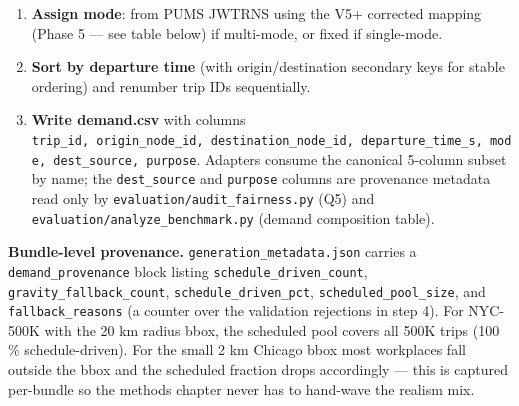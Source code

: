 \begin{enumerate}
  \textbf{Discretization caveat.} Census PUMS records JWMNP in
  \textbf{integer minutes}, so the per-person commute is quantised to
  60-second steps. Combined with the formula above, every person
  reporting the same JWMNP value (e.g., a 6-minute commute) lands on the
  \emph{exact same} \texttt{departure\_time\_s} (e.g., 28440 s = 7:54:00
  AM in the AM peak). For chicago\_1k\_car this collapses 1000 trips
  onto only 20 distinct departure timestamps; for nyc\_10k\_car, 10000
  trips onto 34 timestamps. The aggregate temporal \emph{shape} (peak
  hour distribution, JWMNP histogram) is realistic; the per-second
  departures are not --- at 7:00, 7:15, 7:30, 7:54 etc. SimForge
  releases burst cohorts of trips simultaneously rather than spreading
  them across a continuous range. This is faithful to
  PUMS\textquotesingle s integer-minute reporting, not a SimForge
  artefact, but it is visible in the \texttt{animated\_flow} particle
  visualization (\texttt{visualization/README.md} documents this as the
  "departure burst" effect). Adding sub-minute uniform jitter to spread
  bucket-mates across their 60s window is feature-ready in the demand
  generator but disabled by default to keep \texttt{demand.csv}
  byte-deterministic across regenerations.
\item
  \textbf{Assign mode}: from PUMS JWTRNS using the V5+ corrected mapping
  (Phase 5 --- see table below) if multi-mode, or fixed if single-mode.
\item
  \textbf{Sort by departure time} (with origin/destination secondary
  keys for stable ordering) and renumber trip IDs sequentially.
\item
  \textbf{Write demand.csv} with columns
  \texttt{trip\_id,\ origin\_node\_id,\ destination\_node\_id,\ departure\_time\_s,\ mode,\ dest\_source,\ purpose}.
  Adapters consume the canonical 5-column subset by name; the
  \texttt{dest\_source} and \texttt{purpose} columns are provenance
  metadata read only by \texttt{evaluation/audit\_fairness.py} (Q5) and
  \texttt{evaluation/analyze\_benchmark.py} (demand composition table).
\end{enumerate}

\textbf{Bundle-level provenance.} \texttt{generation\_metadata.json}
carries a \texttt{demand\_provenance} block listing
\texttt{schedule\_driven\_count}, \texttt{gravity\_fallback\_count},
\texttt{schedule\_driven\_pct}, \texttt{scheduled\_pool\_size}, and
\texttt{fallback\_reasons} (a counter over the validation rejections in
step 4). For NYC-500K with the 20 km radius bbox, the scheduled pool
covers all 500K trips (100 \% schedule-driven). For the small 2 km
Chicago bbox most workplaces fall outside the bbox and the scheduled
fraction drops accordingly --- this is captured per-bundle so the
methods chapter never has to hand-wave the realism mix.

